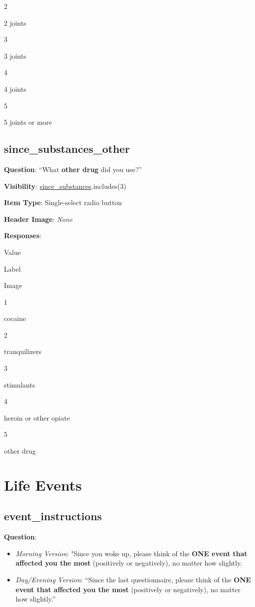 \documentclass[]{book}
\providecommand{\tightlist}{%
  \setlength{\itemsep}{0pt}\setlength{\parskip}{0pt}}
\begin{document}
2

2 joints

3

3 joints

4

4 joints

5

5 joints or more

\hypertarget{since_substances_other}{%
\section{since\_substances\_other}\label{since_substances_other}}

\textbf{Question}: ``What \textbf{other drug} did you use?''

\textbf{Visibility}: \protect\hyperlink{since_substances}{since\_substances}.includes(3)

\textbf{Item Type}: Single-select radio button

\textbf{Header Image}: \emph{None}

\textbf{Responses}:

Value

Label

Image

1

cocaine

2

tranquilizers

3

stimulants

4

heroin or other opiate

5

other drug

\hypertarget{events_section}{%
\chapter{Life Events}\label{events_section}}

\hypertarget{event_instructions}{%
\section{event\_instructions}\label{event_instructions}}

\textbf{Question}:

\begin{itemize}
\tightlist
\item
  \emph{Morning Version}: "Since you woke up, please think of the \textbf{ONE event that affected you the most} (positively or negatively), no matter how slightly.
\item
  \emph{Day/Evening Version}: ``Since the last questionnaire, please think of the \textbf{ONE event that affected you the most} (positively or negatively), no matter how slightly.''
\end{itemize}
\end{document}
